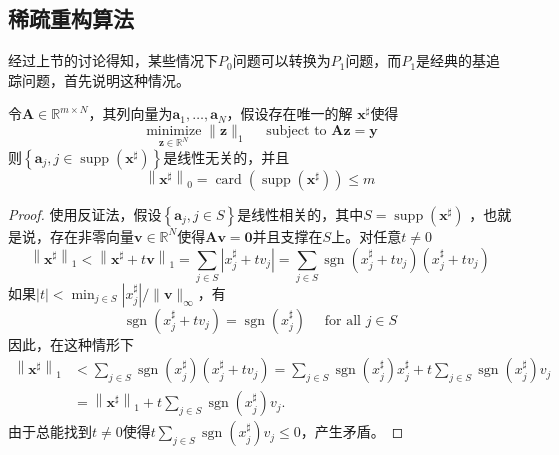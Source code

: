 \subsection{稀疏重构算法}
经过上节的讨论得知，某些情况下$P_0$问题可以转换为$P_1$问题，而$P_1$是经典的基追踪问题，首先说明这种情况。
\begin{theorem}
    令$\mathbf{A} \in \mathbb{R}^{m \times N}$，其列向量为$\mathbf{a}_1, \ldots, \mathbf{a}_N$，假设存在唯一的解
    $\mathbf{x}^{\sharp}$使得
    \begin{equation}
        \underset{\mathbf{z} \in \mathbb{R}^N}{\operatorname{minimize}}\|\mathbf{z}\|_1 \quad \text { subject to } \mathbf{A z}=\mathbf{y}
    \end{equation}
    则$\left\{\mathbf{a}_j, j \in \operatorname{supp}\left(\mathbf{x}^{\sharp}\right)\right\}$是线性无关的，并且
    \begin{equation}
        \left\|\mathbf{x}^{\sharp}\right\|_0=\operatorname{card}\left(\operatorname{supp}\left(\mathbf{x}^{\sharp}\right)\right) \leq m
    \end{equation}
\end{theorem}
\begin{proof}
    使用反证法，假设$\left\{\mathbf{a}_j, j \in S\right\}$是线性相关的，其中$S=\operatorname{supp}\left(\mathbf{x}^{\sharp}\right)$
    ，也就是说，存在非零向量$\mathbf{v} \in \mathbb{R}^N$使得$\mathbf{A v}=\mathbf{0}$并且支撑在$S$上。对任意$t \neq 0$
    \begin{equation}
        \left\|\mathbf{x}^{\sharp}\right\|_1<\left\|\mathbf{x}^{\sharp}+t \mathbf{v}\right\|_1=\sum_{j \in S}\left|x_j^{\sharp}+t v_j\right|=\sum_{j \in S} \operatorname{sgn}\left(x_j^{\sharp}+t v_j\right)\left(x_j^{\sharp}+t v_j\right)
    \end{equation}
    如果$|t|<\min _{j \in S}\left|x_j^{\sharp}\right| /\|\mathbf{v}\|_{\infty}$，有
    \begin{equation}
        \operatorname{sgn}\left(x_j^{\sharp}+t v_j\right)=\operatorname{sgn}\left(x_j^{\sharp}\right) \quad \text { for all } j \in S
    \end{equation}
    因此，在这种情形下
    \begin{equation}
        \begin{aligned}
        \left\|\mathbf{x}^{\sharp}\right\|_1 & <\sum_{j \in S} \operatorname{sgn}\left(x_j^{\sharp}\right)\left(x_j^{\sharp}+t v_j\right)=\sum_{j \in S} \operatorname{sgn}\left(x_j^{\sharp}\right) x_j^{\sharp}+t \sum_{j \in S} \operatorname{sgn}\left(x_j^{\sharp}\right) v_j \\
        & =\left\|\mathbf{x}^{\sharp}\right\|_1+t \sum_{j \in S} \operatorname{sgn}\left(x_j^{\sharp}\right) v_j .
        \end{aligned}
    \end{equation}
    由于总能找到$t \neq 0$使得$t \sum_{j \in S} \operatorname{sgn}\left(x_j^{\sharp}\right) v_j \leq 0$，产生矛盾。
\end{proof}
